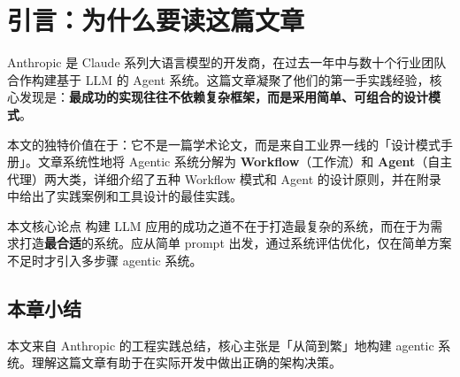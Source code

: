\section{引言：为什么要读这篇文章}

Anthropic 是 Claude 系列大语言模型的开发商，在过去一年中与数十个行业团队合作构建基于 LLM 的 Agent 系统。这篇文章凝聚了他们的第一手实践经验，核心发现是：\textbf{最成功的实现往往不依赖复杂框架，而是采用简单、可组合的设计模式}。

本文的独特价值在于：它不是一篇学术论文，而是来自工业界一线的「设计模式手册」。文章系统性地将 Agentic 系统分解为 \textbf{Workflow}（工作流）和 \textbf{Agent}（自主代理）两大类，详细介绍了五种 Workflow 模式和 Agent 的设计原则，并在附录中给出了实践案例和工具设计的最佳实践。

\begin{importantbox}{本文核心论点}
构建 LLM 应用的成功之道不在于打造最复杂的系统，而在于为需求打造\textbf{最合适}的系统。应从简单 prompt 出发，通过系统评估优化，仅在简单方案不足时才引入多步骤 agentic 系统。
\end{importantbox}

\subsection{本章小结}
本文来自 Anthropic 的工程实践总结，核心主张是「从简到繁」地构建 agentic 系统。理解这篇文章有助于在实际开发中做出正确的架构决策。


